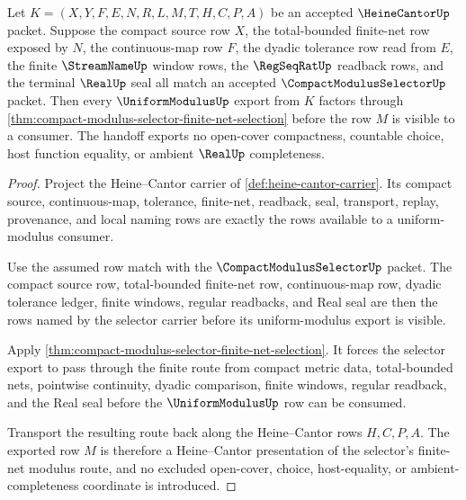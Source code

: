 \begin{theorem}
\label{thm:heine-cantor-compact-modulus-selector-handoff}
Let $K=(X,Y,F,E,N,R,L,M,T,H,C,P,A)$ be an accepted $\HeineCantorUp$ packet. Suppose the compact source row $X$, the total-bounded finite-net row exposed by $N$, the continuous-map row $F$, the dyadic tolerance row read from $E$, the finite $\StreamNameUp$ window rows, the $\RegSeqRatUp$ readback rows, and the terminal $\RealUp$ seal all match an accepted $\CompactModulusSelectorUp$ packet. Then every $\UniformModulusUp$ export from $K$ factors through \autoref{thm:compact-modulus-selector-finite-net-selection} before the row $M$ is visible to a consumer. The handoff exports no open-cover compactness, countable choice, host function equality, or ambient $\RealUp$ completeness.
\end{theorem}
\begin{proof}
Project the Heine--Cantor carrier of \autoref{def:heine-cantor-carrier}. Its compact source, continuous-map, tolerance, finite-net, readback, seal, transport, replay, provenance, and local naming rows are exactly the rows available to a uniform-modulus consumer.

Use the assumed row match with the $\CompactModulusSelectorUp$ packet. The compact source row, total-bounded finite-net row, continuous-map row, dyadic tolerance ledger, finite windows, regular readbacks, and Real seal are then the rows named by the selector carrier before its uniform-modulus export is visible.

Apply \autoref{thm:compact-modulus-selector-finite-net-selection}. It forces the selector export to pass through the finite route from compact metric data, total-bounded nets, pointwise continuity, dyadic comparison, finite windows, regular readback, and the Real seal before the $\UniformModulusUp$ row can be consumed.

Transport the resulting route back along the Heine--Cantor rows $H,C,P,A$. The exported row $M$ is therefore a Heine--Cantor presentation of the selector's finite-net modulus route, and no excluded open-cover, choice, host-equality, or ambient-completeness coordinate is introduced.
\end{proof}


